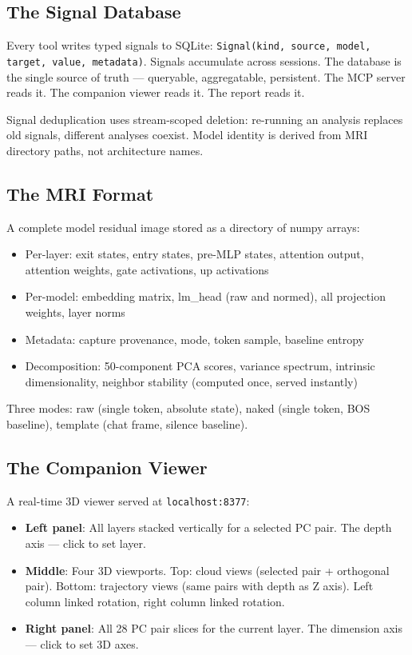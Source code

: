 \documentclass[11pt]{article}
\begin{document}
\subsection{The Signal Database}

Every tool writes typed signals to SQLite: \texttt{Signal(kind, source, model, target, value, metadata)}. Signals accumulate across sessions. The database is the single source of truth --- queryable, aggregatable, persistent. The MCP server reads it. The companion viewer reads it. The report reads it.

Signal deduplication uses stream-scoped deletion: re-running an analysis replaces old signals, different analyses coexist. Model identity is derived from MRI directory paths, not architecture names.

\subsection{The MRI Format}

A complete model residual image stored as a directory of numpy arrays:
\begin{itemize}
\item Per-layer: exit states, entry states, pre-MLP states, attention output, attention weights, gate activations, up activations
\item Per-model: embedding matrix, lm\_head (raw and normed), all projection weights, layer norms
\item Metadata: capture provenance, mode, token sample, baseline entropy
\item Decomposition: 50-component PCA scores, variance spectrum, intrinsic dimensionality, neighbor stability (computed once, served instantly)
\end{itemize}

Three modes: raw (single token, absolute state), naked (single token, BOS baseline), template (chat frame, silence baseline).

\subsection{The Companion Viewer}

A real-time 3D viewer served at \texttt{localhost:8377}:
\begin{itemize}
\item \textbf{Left panel}: All layers stacked vertically for a selected PC pair. The depth axis --- click to set layer.
\item \textbf{Middle}: Four 3D viewports. Top: cloud views (selected pair + orthogonal pair). Bottom: trajectory views (same pairs with depth as Z axis). Left column linked rotation, right column linked rotation.
\item \textbf{Right panel}: All 28 PC pair slices for the current layer. The dimension axis --- click to set 3D axes.
\end{itemize}
\end{document}
